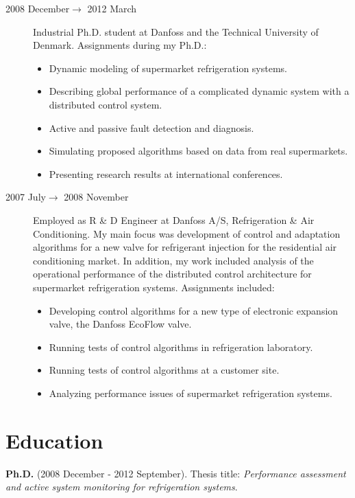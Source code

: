 \documentclass[margin,line,a4paper]{resume}
\begin{document}
\begin{resume}
\begin{description}
    \item[2008 December$\rightarrow$ 2012 March] Industrial Ph.D. student at Danfoss and the Technical University of Denmark. Assignments during my Ph.D.:
      \begin{itemize}
      \item Dynamic modeling of supermarket refrigeration systems.
      \item Describing global performance of a complicated dynamic system with a distributed control system.
      \item Active and passive fault detection and diagnosis.
      \item Simulating proposed algorithms based on data from real supermarkets.
      \item Presenting research results at international conferences. 
      \end{itemize}

    \item[2007 July$\rightarrow$ 2008 November] Employed as R \& D Engineer at Danfoss A/S, Refrigeration \& Air Conditioning. My main focus was development of control and adaptation algorithms for a new valve for refrigerant injection for the residential air conditioning market. In addition, my work included analysis of the operational performance of the distributed control architecture for supermarket refrigeration systems.
      Assignments included:
      \begin{itemize}
      \item Developing control algorithms for a new type of electronic expansion valve, the Danfoss EcoFlow valve.
      \item Running tests of control algorithms in refrigeration laboratory.
      \item Running tests of control algorithms at a customer site.
      \item Analyzing performance issues of supermarket refrigeration systems.
      \end{itemize}

\end{description} 

\section{\mysidestyle Education} 

    \textbf{Ph.D.} (2008 December - 2012 September). Thesis title: \textit{Performance assessment and active system monitoring for refrigeration systems}. 


\end{resume}
\end{document}
